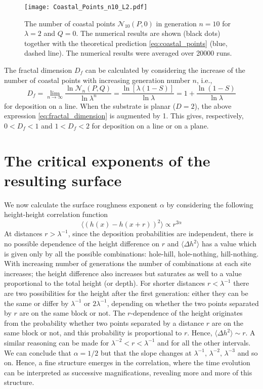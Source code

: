 \documentclass[amsmath,amssymb,amsfonts,aps,pre,preprint,superscriptaddress,bibnotes,showpacs,showkeys,longbibliography,nofootinbib]{revtex4-1}
\begin{document}
\begin{figure}[htp]
    \centering
    \texttt{[image: Coastal\_Points\_n10\_L2.pdf]}
    \caption{The number of coastal points $\mathcal{N}_{10}(P,0)$ in generation $n=10$ for $\lambda=2$ and $Q=0$. The numerical results are shown (black dots) together with the theoretical prediction \eqref{eq:coastal_points} (blue, dashed line). The numerical results were averaged over 20000 runs.}
    \label{fig:coastal_points_solution}
\end{figure}

The fractal dimension $D_f$ can be calculated by considering the increase of the number of coastal points with  increasing generation number $n$, i.e.,
\begin{equation}
    \label{eq:fractal_dimension}
    D_f = \lim_{n\rightarrow\infty}\frac{\ln{\mathcal{N}_n(P,Q)}}{\ln{\lambda^n}} = \frac{\ln{\left[\lambda (1-S)\right]}}{\ln{\lambda}} =  1+\frac{\ln{(1-S)}}{\ln{\lambda}}
\end{equation}
for deposition on a line. When the substrate is planar ($D=2$), the above expression \eqref{eq:fractal_dimension} is augmented by 1. This gives, respectively, $0<D_f<1$ and $1<D_f<2$ for deposition on a line or on a plane.


\section{The critical exponents of the resulting surface}
\label{sec:exponents}
We now calculate the surface roughness exponent $\alpha$ by considering the following height-height correlation function \cite{PhdGiuraniuc} 
\begin{equation}
    \label{eq:height_correlation}
    \langle (h(x) - h(x+r))^2\rangle \propto r^{2\alpha}
\end{equation}
At distances $r>\lambda^{-1}$, since the deposition probabilities are independent, there is no possible dependence of the height difference on $r$ and $\langle\Delta h^2\rangle$ has a value which is given only by all the possible combinations: hole-hill, hole-nothing, hill-nothing. With increasing number of generations the number of combinations at each site increases; the height difference also increases but saturates as well to a value proportional to the total height (or depth). For shorter distances $r<\lambda^{-1}$ there are two possibilities for the height after the first generation: either they can be the same or differ by $\lambda^{-1}$ or $2\lambda^{-1}$, depending on whether the two points separated by $r$ are on the same block or not. The $r$-dependence of the height originates from the probability whether two points separated by a distance $r$ are on the same block or not, and this probability is proportional to $r$. Hence, $\langle \Delta h^2\rangle \sim r$. A similar reasoning can be made for $\lambda^{-2} < r < \lambda^{-1}$ and for all the other intervals. We can conclude that $\alpha = 1/2$ but that the slope changes at $\lambda^{-1},\, \lambda^{-2},\, \lambda^{-3}$ and so on. Hence, a fine structure emerges in the correlation, where the time evolution can be interpreted as successive magnifications, revealing more and more of this structure.
\end{document}
